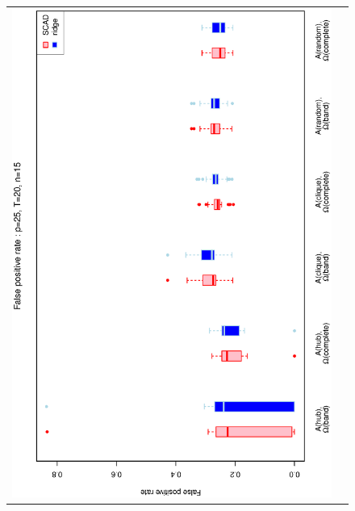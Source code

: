 \documentclass[a4paper]{article}
\begin{document}
\begin{figure}[h!]
\centering
\begin{tabular}{cc}
\includegraphics[scale=0.45,angle=270]{ROCfpr25T20N15_25.eps}
\\

\end{tabular}
\end{figure}
\end{document}
